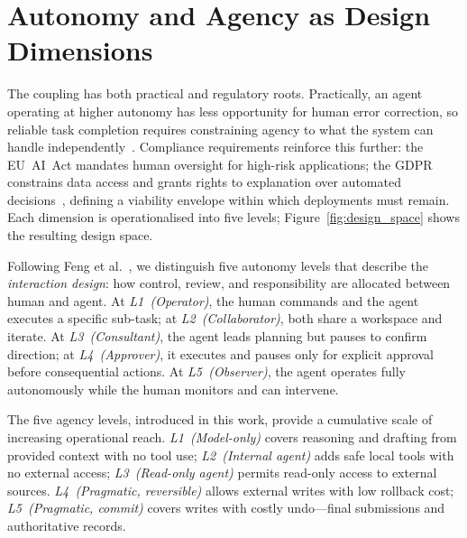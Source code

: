 \section{Autonomy and Agency as Design Dimensions}

The coupling has both practical and regulatory roots. Practically, an agent operating at higher autonomy has less opportunity for human error correction, so reliable task completion requires constraining agency to what the system can handle independently~\cite{Feng2025Levels,Mitchell2025}. Compliance requirements reinforce this further: the EU~AI~Act mandates human oversight for high-risk applications; the GDPR constrains data access and grants rights to explanation over automated decisions~\cite{eu_ai_act_2024,gdpr_2016}, defining a viability envelope within which deployments must remain. Each dimension is operationalised into five levels; Figure~\ref{fig:design_space} shows the resulting design space.

Following Feng et al.~\cite{Feng2025Levels}, we distinguish five autonomy levels that describe the \emph{interaction design}: how control, review, and responsibility are allocated between human and agent. At \emph{L1~(Operator)}, the human commands and the agent executes a specific sub-task; at \emph{L2~(Collaborator)}, both share a workspace and iterate. At \emph{L3~(Consultant)}, the agent leads planning but pauses to confirm direction; at \emph{L4~(Approver)}, it executes and pauses only for explicit approval before consequential actions. At \emph{L5~(Observer)}, the agent operates fully autonomously while the human monitors and can intervene.

The five agency levels, introduced in this work, provide a cumulative scale of increasing operational reach. \emph{L1~(Model-only)} covers reasoning and drafting from provided context with no tool use; \emph{L2~(Internal agent)} adds safe local tools with no external access; \emph{L3~(Read-only agent)} permits read-only access to external sources. \emph{L4~(Pragmatic, reversible)} allows external writes with low rollback cost; \emph{L5~(Pragmatic, commit)} covers writes with costly undo---final submissions and authoritative records.

